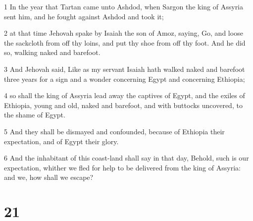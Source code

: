 \par 1 In the year that Tartan came unto Ashdod, when Sargon the king of Assyria sent him, and he fought against Ashdod and took it;
\par 2 at that time Jehovah spake by Isaiah the son of Amoz, saying, Go, and loose the sackcloth from off thy loins, and put thy shoe from off thy foot. And he did so, walking naked and barefoot.
\par 3 And Jehovah said, Like as my servant Isaiah hath walked naked and barefoot three years for a sign and a wonder concerning Egypt and concerning Ethiopia;
\par 4 so shall the king of Assyria lead away the captives of Egypt, and the exiles of Ethiopia, young and old, naked and barefoot, and with buttocks uncovered, to the shame of Egypt.
\par 5 And they shall be dismayed and confounded, because of Ethiopia their expectation, and of Egypt their glory.
\par 6 And the inhabitant of this coast-land shall say in that day, Behold, such is our expectation, whither we fled for help to be delivered from the king of Assyria: and we, how shall we escape?

\chapter{21}

